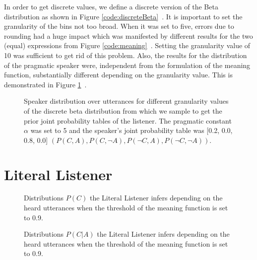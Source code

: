 In order to get discrete values, we define a discrete version of the Beta distribution as shown in Figure \ref{code:discreteBeta}~. It is important to set the granularity of the bins not too broad. When it was set to five, errors due to rounding had a huge impact which was manifested by different results for the two (equal) expressions from Figure \ref{code:meaning}~. Setting the granularity value of 10 was sufficient to get rid of this problem. Also, the results for the distribution of the pragmatic speaker were, independent from the formulation of the meaning function, substantially different depending on the granularity value. This is demonstrated in Figure \ref{fig:impactGranularity}~. 


\begin{figure}
\centering
{} \qquad
{}
\caption{Speaker distribution over utterances for different granularity values of the discrete beta distribution from which we sample to get the prior joint probability tables of the listener. The pragmatic constant $\alpha$ was set to 5 and the speaker's joint probability table was [0.2, 0.0, 0.8, 0.0] $(P(C,A), P(C,\neg A), P(\neg C, A), P(\neg C, \neg A))$. }
\label{fig:impactGranularity}
\end{figure}

\FloatBarrier
\section*{Literal Listener}

\begin{figure}[ht]
\qquad
{}\qquad

\qquad 
{}
\caption{Distributions $P(C)$ the Literal Listener infers depending on the heard utterances when the threshold of the meaning function is set to 0.9.}
\label{fig:LL-distributions-P-C}
\end{figure}


\begin{figure}[ht]
\qquad
{}\qquad

\qquad
{}
\caption{Distributions $P(C|A)$ the Literal Listener infers depending on the heard utterances when the threshold of the meaning function is set to 0.9.}
\label{fig:LL-distributions-P-CA}
\end{figure}

